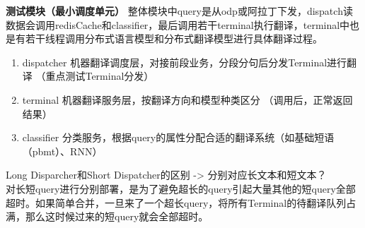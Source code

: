 \documentclass[10pt,a4paper]{ctexbook}
\begin{document}
  
\textbf{测试模块（最小调度单元）}
整体模块中query是从odp或阿拉丁下发，dispatch读数据会调用redisCache和classifier，最后调用若干terminal执行翻译，terminal中也是有若干线程调用分布式语言模型和分布式翻译模型进行具体翻译过程。
\begin{enumerate}
\item dispatcher 机器翻译调度层，对接前段业务，分段分句后分发Terminal进行翻译 （重点测试Terminal分发）
\item terminal 机器翻译服务层，按翻译方向和模型种类区分 （调用后，正常返回结果）
\item classifier 分类服务，根据query的属性分配合适的翻译系统（如基础短语（pbmt）、RNN）
\end{enumerate}

Long Disparcher和Short Dispatcher的区别  -> 分别对应长文本和短文本？ \\
对长短query进行分别部署，是为了避免超长的query引起大量其他的短query全部超时。如果简单合并，一旦来了一个超长query，将所有Terminal的待翻译队列占满，那么这时候过来的短query就会全部超时。


\ifx\mlbook\undefined
    
\end{document}
